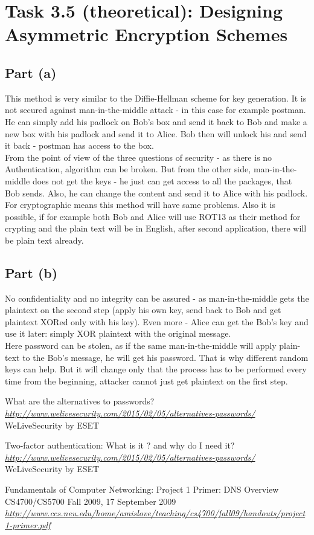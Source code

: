 \documentclass{article}
\begin{document}
\section*{Task 3.5 (theoretical): Designing Asymmetric Encryption Schemes}
\subsection*{Part (a)}
This method is very similar to the Diffie-Hellman scheme for key generation. It is not secured against man-in-the-middle attack - in this case for example postman. He can simply add his padlock on Bob's box and send it back to Bob and make a new box with his padlock and send it to Alice. Bob then will unlock his and send it back - postman has access to the box. 
\\
From the point of view of the three questions of security - as there is no Authentication, algorithm can be broken. But from the other side, man-in-the-middle does not get the keys - he just can get access to all the packages, that Bob sends. Also, he can change the content and send it to Alice with his padlock.
\\
For cryptographic means this method will have same problems. Also it is possible, if for example both Bob and Alice will use ROT13 as their method for crypting and the plain text will be in English, after second application, there will be plain text already.

\subsection*{Part (b)}
No confidentiality and no integrity can be assured - as man-in-the-middle gets the plaintext on the second step (apply his own key, send back to Bob and get plaintext XORed only with his key). Even more - Alice can get the Bob's key and use it later: simply XOR plaintext with the original message.
\\
Here password can be stolen, as if the same man-in-the-middle will apply plain-text to the Bob's message, he will get his password. That is why different random keys can help. But it will change only that the process has to be performed every time from the beginning, attacker cannot just get plaintext on the first step.

\begin{thebibliography}{9}

  What are the alternatives to passwords?
  \emph{\url{http://www.welivesecurity.com/2015/02/05/alternatives-passwords/}}
  WeLiveSecurity by ESET
  
  Two-factor authentication: What is it ? and why do I need it?
  \emph{\url{http://www.welivesecurity.com/2015/02/05/alternatives-passwords/}}
  WeLiveSecurity by ESET

 Fundamentals of Computer Networking: Project 1 Primer: DNS Overview
 CS4700/CS5700 Fall 2009, 17 September 2009
 \emph{\url{http://www.ccs.neu.edu/home/amislove/teaching/cs4700/fall09/handouts/project1-primer.pdf}}

\end{thebibliography}
\end{document}
